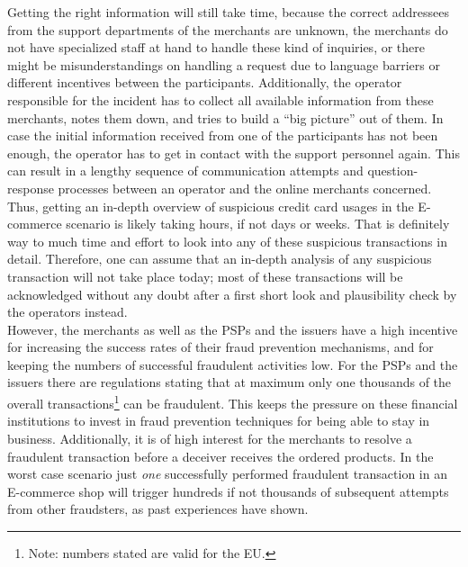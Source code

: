 Getting the right information will still take time, because the correct addressees from the support departments of the merchants are unknown, the merchants do not have specialized staff at hand to handle these kind of inquiries, or there might be misunderstandings on handling a request due to language barriers or different incentives between the participants. Additionally, the operator responsible for the incident has to collect all available information from these merchants, notes them down, and tries to build a ``big picture'' out of them. In case the initial information received from one of the participants has not been enough, the operator has to get in contact with the support personnel again. This can result in a lengthy sequence of communication attempts and question-response processes between an operator and the online merchants concerned. Thus, getting an in-depth overview of suspicious credit card usages in the \gls{E-commerce} scenario is likely taking hours, if not days or weeks. That is definitely way to much time and effort to look into any of these suspicious transactions in detail. Therefore, one can assume that an in-depth analysis of any suspicious transaction will not take place today; most of these transactions will be acknowledged without any doubt after a first short look and plausibility check by the operators instead. \\

However, the merchants as well as the \gls{PSP}s and the issuers have a high incentive for increasing the success rates of their fraud prevention mechanisms, and for keeping the numbers of successful fraudulent activities low. For the \gls{PSP}s and the issuers there are regulations stating that at maximum only one thousands of the overall transactions\footnote{Note: numbers stated are valid for the EU.} can be fraudulent. This keeps the pressure on these financial institutions to invest in fraud prevention techniques for being able to stay in business. Additionally, it is of high interest for the merchants to resolve a fraudulent transaction before a deceiver receives the ordered products. In the worst case scenario just \emph{one} successfully performed fraudulent transaction in an \gls{E-commerce} shop will trigger hundreds if not thousands of subsequent attempts from other fraudsters, as past experiences have shown.


